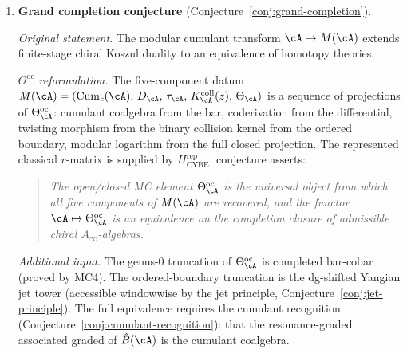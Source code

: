 \begin{enumerate}[resume, label=\textup{(\arabic*)}]
 \smallskip\noindent
 \emph{Strategy from $\Theta^{\mathrm{oc}}$.}
 The four-sector decomposition of the MC equation
 produces, at each $(g,n)$, a compatibility condition
 between the open and closed sectors. The genus-$g$
 clutching identity
 $\xi^*(\Theta^{(g)}) = \sum_{g_1+g_2=g}
 \Theta^{(g_1)} \star \Theta^{(g_2)}$
 is proved (Theorem~\ref{thm:mc2-bar-intrinsic}(iii)).
 The cooperad axiom (coassociativity) would follow from the
 associativity of the bordered FM clutching maps, once
 these are constructed for all stable topological types.

\item \textbf{Grand completion conjecture}
 (Conjecture~\ref{conj:grand-completion}).

 \smallskip\noindent
 \emph{Original statement.}
 The modular cumulant transform $\cA \mapsto M(\cA)$ extends
 finite-stage chiral Koszul duality to an equivalence of
 homotopy theories.

 \smallskip\noindent
 \emph{$\Theta^{\mathrm{oc}}$ reformulation.}
 The five-component datum
 $M(\cA) = (\operatorname{Cum}_c(\cA),\, D_\cA,\,
 \tau_\cA,\, K_\cA^{\mathrm{coll}}(z),\, \Theta_\cA)$
 is a sequence of projections of
 $\Theta^{\mathrm{oc}}_\cA$: cumulant coalgebra from the bar,
 coderivation from the differential, twisting morphism from the
 binary collision kernel from the ordered boundary,
 modular logarithm from the full closed projection. The
 represented classical $r$-matrix is supplied by
 $H_{\mathrm{CYBE}}^{\mathrm{rep}}$.
 conjecture asserts:
 \begin{quote}
 \emph{The open/closed MC element
 $\Theta^{\mathrm{oc}}_\cA$ is the universal object from which
 all five components of $M(\cA)$ are recovered, and the
 functor $\cA \mapsto \Theta^{\mathrm{oc}}_\cA$ is an
 equivalence on the completion closure of admissible
 chiral $A_\infty$-algebras.}
 \end{quote}

 \smallskip\noindent
 \emph{Additional input.}
 The genus-$0$ truncation of $\Theta^{\mathrm{oc}}_\cA$ is
 completed bar-cobar (proved by MC4). The ordered-boundary
 truncation is the dg-shifted Yangian jet tower (accessible
 windowwise by the jet principle,
 Conjecture~\ref{conj:jet-principle}). The full equivalence
 requires the cumulant recognition
 (Conjecture~\ref{conj:cumulant-recognition}): that the
 resonance-graded associated graded of $\hat{B}(\cA)$ is the
 cumulant coalgebra.

\end{enumerate}

